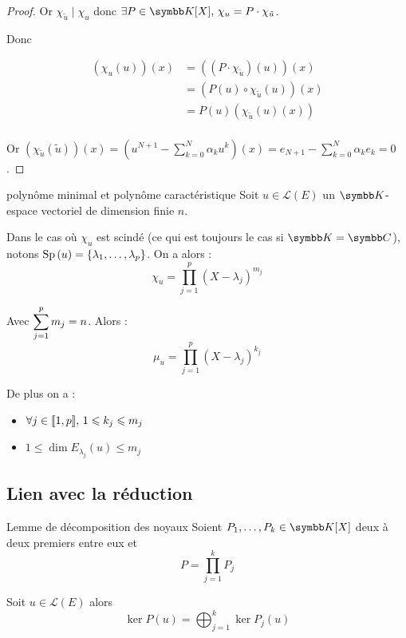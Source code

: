 \begin{proof}
    Or $\chi_{\tilde u} \mid \chi_u$ donc $\exists P \in \K[X], \, \chi_u = P \cdot \chi_{\tilde u}$.

    Donc 

    \begin{align}
        (\chi_u(u))(x) & = ((P \cdot \chi_{\tilde u})(u))(x) \\
        & = (P(u) \circ \chi_{\tilde u}(u))(x) \\
        & = P(u)(\chi_{\tilde u}(u)(x)) \\
    \end{align}

    Or $\displaystyle (\chi_{\tilde u}(\tilde u))(x) = (u^{N + 1} - \sum_{k = 0 }^{ N } \alpha_k u^k)(x) = e_{N + 1} - \sum_{k = 0 }^{ N } \alpha_k e_k = 0$.
\end{proof}

\begin{corollaire}{polynôme minimal et polynôme caractéristique}{}
    Soit $u \in \mathscr L(E)$ un $\K$-espace vectoriel de dimension finie $n$.

    Dans le cas où $\chi_u$ est scindé (ce qui est toujours le cas si $\K = \C$), 
    notons $\operatorname{Sp} \,(u) = \{\lambda_1, \ldots, \lambda_p\}$. On a alors : 
    $$\chi_u = \displaystyle \prod_{j = 1 }^{ p } (X - \lambda_j)^{m_j}$$

    Avec $\displaystyle \sum_{j = 1 }^{p } m_j = n$.
    Alors : 
    $$\mu_u = \displaystyle \prod_{j = 1 }^{ p } (X - \lambda_j)^{k_j}$$

    De plus on a : 
    \begin{itemize}
        \item $\forall j \in [\![1, p]\!], \, 1 \leqslant k_j \leqslant m_j$
        \item $1 \leqslant \dim E_{\lambda_j}(u) \leqslant m_j$ 
    \end{itemize}
\end{corollaire}

\subsection{Lien avec la réduction}

\begin{theoreme}{Lemme de décomposition des noyaux}{}
    Soient $P_1, \dots, P_k \in \K[X]$ deux à deux premiers entre eux et 
    $$P = \displaystyle \prod_{j = 1 }^{ k } P_j$$   
    
    Soit $u \in \mathscr L(E)$ alors 
    $$\displaystyle \ker P(u) = \bigoplus_{j = 1 }^{ k } \ker P_j(u)$$
\end{theoreme}

